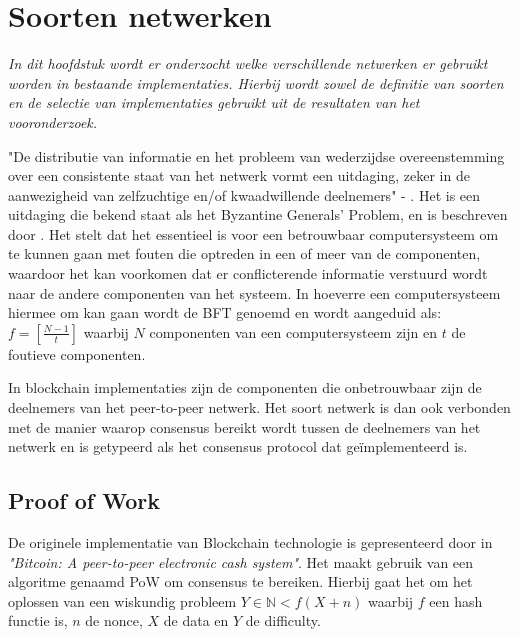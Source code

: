 \section{Soorten netwerken}

\textit{In dit hoofdstuk wordt er onderzocht welke verschillende netwerken er gebruikt worden in bestaande implementaties. Hierbij wordt zowel de definitie van soorten en de selectie van implementaties gebruikt uit de resultaten van het vooronderzoek.}

"De distributie van informatie en het probleem van wederzijdse overeenstemming over een consistente staat van het netwerk vormt een uitdaging, zeker in de aanwezigheid van zelfzuchtige en/of kwaadwillende deelnemers" - \citet{7423672}. Het is een uitdaging die bekend staat als het Byzantine Generals' Problem, en is beschreven door \citet{lamport1982byzantine}. Het stelt dat het essentieel is voor een betrouwbaar computersysteem om te kunnen gaan met fouten die optreden in een of meer van de componenten, waardoor het kan voorkomen dat er conflicterende informatie verstuurd wordt naar de andere componenten van het systeem. In hoeverre een computersysteem hiermee om kan gaan wordt de \acrfull{BFT} genoemd en wordt aangeduid als: $ f = [\frac{N - 1}{t}] $ waarbij \(N\) componenten van een computersysteem zijn en \(t\) de foutieve componenten.

In blockchain implementaties zijn de componenten die onbetrouwbaar zijn de deelnemers van het peer-to-peer netwerk. Het soort netwerk is dan ook verbonden met de manier waarop consensus bereikt wordt tussen de deelnemers van het netwerk en is getypeerd als het consensus protocol dat geïmplementeerd is.

\newpage

\subsection{Proof of Work}
\label{chapter-proof-of-work}
De originele implementatie van Blockchain technologie is gepresenteerd door \citet{nakamoto2008bitcoin} in \textit{"Bitcoin: A peer-to-peer electronic cash system"}. Het maakt gebruik van een algoritme genaamd \acrfull{PoW} om consensus te bereiken. Hierbij gaat het om het oplossen van een wiskundig probleem $Y \in \mathbb{N} < f(X + n)$ waarbij $f$ een hash functie is, $n$ de \gls{nonce}, $X$ de data en $Y$ de \gls{difficulty}.

